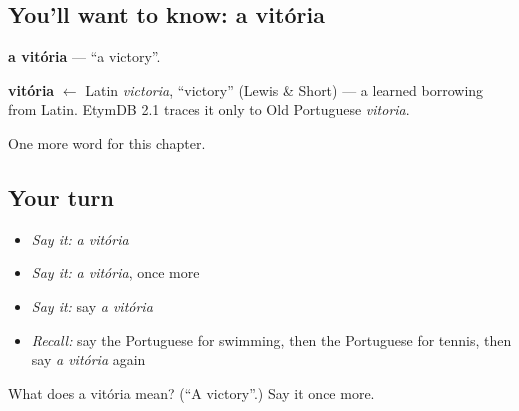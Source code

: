 \subsection*{You'll want to know: a vitória}
\textbf{a vitória} — \textquotedblleft{}a victory\textquotedblright{}.

\begin{cousinweb}
\textbf{vitória} $\leftarrow$ Latin \emph{victoria}, \textquotedblleft{}victory\textquotedblright{} (Lewis \& Short) — a learned borrowing from Latin. EtymDB 2.1 traces it only to Old Portuguese \emph{vitoria}.
\end{cousinweb}

\begin{grammarlens}[title={What you've built}]
One more word for this chapter.
\end{grammarlens}

\subsection*{Your turn}
\begin{itemize}
\raggedright
  \item \emph{Say it:} \emph{a vitória}
  \item \emph{Say it:} \emph{a vitória}, once more
  \item \emph{Say it:} say \emph{a vitória}
  \item \emph{Recall:} say the Portuguese for swimming, then the Portuguese for tennis, then say \emph{a vitória} again
\end{itemize}

\begin{tcolorbox}[breakable,colback=teal!4,colframe=teal!35!black,title={Before you move on}]
What does a vitória mean? (\textquotedblleft{}A victory\textquotedblright{}.) Say it once more.
\end{tcolorbox}
